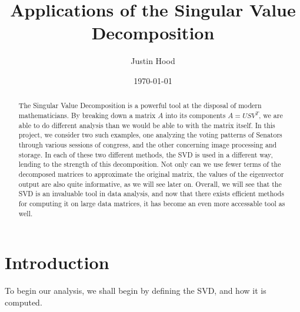 \documentclass[letterpaper,12pt]{article}
\title{\textbf{Applications of the Singular Value Decomposition}}
\author{Justin Hood}
\date{\today}
\begin{document}
\maketitle
\newpage
\begin{abstract}
The Singular Value Decomposition is a powerful tool at the disposal of modern mathematicians. By breaking down a matrix $A$ into its components $A=USV^T$, we are able to do different analysis than we would be able to with the matrix itself. In this project, we consider two such examples, one analyzing the voting patterns of Senators through various sessions of congress, and the other concerning image processing and storage. In each of these two different methods, the SVD is used in a different way, lending to the strength of this decomposition. Not only can we use fewer terms of the decomposed matrices to approximate the original matrix, the values of the eigenvector output are also quite informative, as we will see later on. Overall, we will see that the SVD is an invaluable tool in data analysis, and now that there exists efficient methods for computing it on large data matrices, it has become an even more accessable tool as well.
\end{abstract}
\newpage

\tableofcontents
\newpage

\section{Introduction}
To begin our analysis, we shall begin by defining the SVD, and how it is computed.
\end{document}

